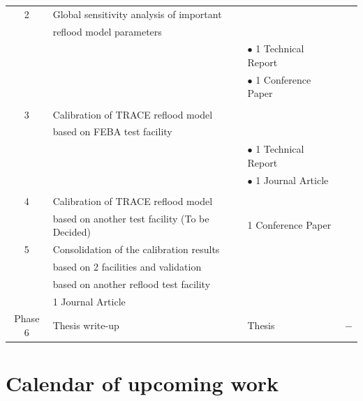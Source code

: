 \documentclass[11pt,titlepage]{article}
\begin{document}
\begin{table}[!h]
\begin{center}
\begin{tabular}{  c  p{4cm}  p{2.5cm} p{8cm}}
                     2
                   & Global sensitivity analysis of important & & \\
                   & reflood model parameters & & \\               
                   &  &  $\bullet$ 1 Technical Report & \\
                   &  &  $\bullet$ 1 Conference Paper & \\
                     \\\midrule
                     3
                   & Calibration of TRACE reflood model & & \\
                   & based on FEBA test facility & & \\               
                   & & $\bullet$ 1 Technical Report  & \\
                   & & $\bullet$ 1 Journal Article   & \\               \\\midrule
                     4
                   & Calibration of TRACE reflood model & & \\
                   & based on another test
                     facility (To be Decided)               
                   & 1 Conference Paper                            
                    \\\midrule
                     5
                   & Consolidation of the calibration results & & \\
                   & based on 2 facilities and validation & & \\
                   & based on another reflood test facility & & \\         
                   & 1 Journal Article            
                    \\\midrule 
                     Phase 6
                   & Thesis write-up               
                   & Thesis                
                   & $-$\\
                     \bottomrule    
    \end{tabular}
\end{center}
\end{table}


\section{Calendar of upcoming work}
\end{document}
